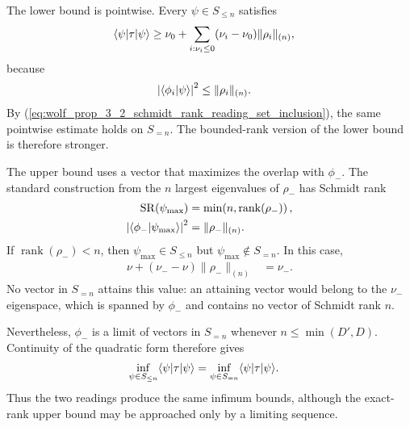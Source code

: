 \documentclass[11pt]{article}
\begin{document}
The lower bound is pointwise. Every $\psi\in S_{\leq n}$ satisfies
\begin{align}
    \langle \psi|\tau|\psi\rangle
        &\geq \nu_0+
        \sum_{i:\nu_i\leq0}
        (\nu_i-\nu_0)\lVert\rho_i\rVert_{(n)},
    \label{eq:wolf_prop_3_2_schmidt_rank_reading_pointwise_lower_bound}
\end{align}
because
\begin{align}
    \left|\langle \phi_i | \psi \rangle\right|^2
        &\leq\lVert\rho_i\rVert_{(n)}.
    \label{eq:wolf_prop_3_2_schmidt_rank_reading_overlap_bound}
\end{align}
By (\ref{eq:wolf_prop_3_2_schmidt_rank_reading_set_inclusion}), the same
pointwise estimate holds on $S_{=n}$. The bounded-rank version of the lower
bound is therefore stronger.

The upper bound uses a vector that maximizes the overlap with $\phi_-$. The
standard construction from the $n$ largest eigenvalues of $\rho_-$ has
Schmidt rank
\begin{align}
    \operatorname{SR}(\psi_{\max})
        &=\min\!\left(n,\operatorname{rank}(\rho_-)\right),
    \label{eq:wolf_prop_3_2_schmidt_rank_reading_witness_rank}\\
    \left|\langle \phi_- | \psi_{\max} \rangle\right|^2
        &=\lVert\rho_-\rVert_{(n)}.
    \label{eq:wolf_prop_3_2_schmidt_rank_reading_maximal_overlap}
\end{align}
If $\operatorname{rank}(\rho_-)<n$, then $\psi_{\max}\in S_{\leq n}$ but
$\psi_{\max}\notin S_{=n}$. In this case,
\begin{align}
    \nu+(\nu_--\nu)\lVert\rho_-\rVert_{(n)}
        &=\nu_-.
    \label{eq:wolf_prop_3_2_schmidt_rank_reading_upper_value}
\end{align}
No vector in $S_{=n}$ attains this value: an attaining vector would belong to
the $\nu_-$ eigenspace, which is spanned by $\phi_-$ and contains no vector of
Schmidt rank $n$.

Nevertheless, $\phi_-$ is a limit of vectors in $S_{=n}$ whenever
$n\leq\min(D',D)$. Continuity of the quadratic form therefore gives
\begin{align}
    \inf_{\psi\in S_{\leq n}}\langle \psi|\tau|\psi\rangle
        &=\inf_{\psi\in S_{=n}}\langle \psi|\tau|\psi\rangle.
    \label{eq:wolf_prop_3_2_schmidt_rank_reading_equal_infima}
\end{align}
Thus the two readings produce the same infimum bounds, although the exact-rank
upper bound may be approached only by a limiting sequence.
\end{document}
